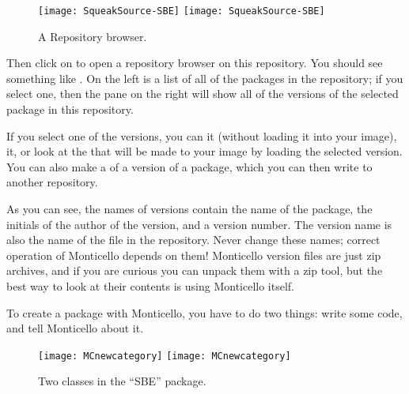 \documentclass[a4paper,10pt,twoside]{book}
\begin{document}
\begin{figure}[btp]
	\begin{center}
	\ifluluelse
		{\texttt{[image: SqueakSource-SBE]}}
		{\texttt{[image: SqueakSource-SBE]}}
	\end{center}
	\caption{A Repository browser.}
	\label{fig:SqueakSource:SBE}
\end{figure}
\noindent
Then click on  to open a repository browser on this repository.  You should see something like .  On the left is a list of all of the packages in the repository; if you select one, then the pane on the right will show all of the versions of the selected package in this repository. 

If you select one of the versions, you can  it (without loading it into your image),  it, or look at the  that will be made to your image by loading the selected version.  You can also make a  of a version of a package, which you can then write to another repository.

As you can see, the names of versions contain the name of the package, the initials of the author of the version, and a version number.  The version name is also the name of the file in the repository.  Never change these names; correct operation of Monticello depends on them!   Monticello version files are just zip archives, and if you are curious you can unpack them with a zip tool, but the best way to look at their contents is using Monticello itself.  

To create a package with Monticello, you have to do two things: write some code, and tell Monticello about it.


\begin{figure}[btp]
	\begin{center}
	\ifluluelse
		{\texttt{[image: MCnewcategory]}}
		{\texttt{[image: MCnewcategory]}}
	\end{center}
	\caption{Two classes in the ``SBE'' package.}
	\label{fig:MCnewcategory}
\end{figure}
\end{document}
